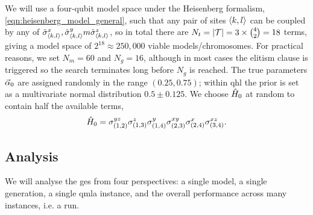 We will use a four-qubit model space under the Heisenberg formalism, \cref{eqn:heisenberg_model_general}, 
    such that any pair of sites ${ \langle k, l \rangle }$ can be coupled by any of $\hat{\sigma}^x_{{ \langle k, l \rangle }}, \hat{\sigma}^y_{{ \langle k, l \rangle }}m \hat{\sigma}^z_{{ \langle k, l \rangle }}$, 
    so in total there are $N_t = |{ \mathcal{T} }| = 3 \times {4 \choose 2} = 18$ terms, 
    giving a model space of $2^{18} \approx 250,000$ viable models/chromosomes. 
For practical reasons\footnotemark, we set $N_m=60$ and $N_g=16$, although in most cases the 
    elitism clause is triggered so the search terminates long before $N_g$ is reached. 
The true parameters $\vec{\alpha}_0$ are assigned randomly in the range $(0.25, 0.75)$; 
    within \gls{qhl} the prior is set as a multivariate normal distribution $0.5 \pm 0.125$. 
We choose $\hat{H}_0$ at random to contain half the available terms\footnotemark,
\begin{equation}
    \label{eqn:gen_alg_true_model}
    \hat{H}_0 = \sigma_{(1, 2)}^{yz}\sigma_{(1, 3)}^{z}\sigma_{(1, 4)}^{y}\sigma_{(2, 3)}^{xy}\sigma_{(2, 4)}^{x}\sigma_{(3, 4)}^{xz}.
\end{equation} 
\par 
\subsection{Analysis}
We will analyse the \gls{ges} from four perspectives: 
    a single model, a single generation, a single \gls{qmla} \gls{instance}, 
    and the overall performance across many instances, i.e. a \gls{run}.
\par 

